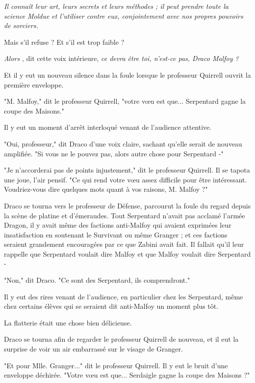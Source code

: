 \emph{Il connaît leur art, leurs secrets et leurs méthodes ; il peut prendre toute la science Moldue et l'utiliser contre eux, conjointement avec nos propres pouvoirs de sorciers.} 

Mais s'il refuse ? Et s'il est trop faible ?

\emph{Alors} , dit cette voix intérieure, \emph{ce devra être toi, n'est-ce pas, Draco Malfoy ?} 

Et il y eut un nouveau silence dans la foule lorsque le professeur Quirrell ouvrit la première enveloppe.

"M. Malfoy," dit le professeur Quirrell, "votre vœu est que... Serpentard gagne la coupe des Maisons."

Il y eut un moment d'arrêt interloqué venant de l'audience attentive.

"Oui, professeur," dit Draco d'une voix claire, sachant qu'elle serait de nouveau amplifiée. "Si vous ne le pouvez pas, alors autre chose pour Serpentard -"

"Je n'accorderai pas de points injustement," dit le professeur Quirrell. Il se tapota une joue, l'air pensif. "Ce qui rend votre vœu assez difficile pour être intéressant. Voudriez-vous dire quelques mots quant à vos raisons, M. Malfoy ?"

Draco se tourna vers le professeur de Défense, parcourut la foule du regard depuis la scène de platine et d'émeraudes. Tout Serpentard n'avait pas acclamé l'armée Dragon, il y avait même des factions anti-Malfoy qui avaient exprimées leur insatisfaction en soutenant le Survivant ou même Granger ; et ces factions seraient grandement encouragées par ce que Zabini avait fait. Il fallait qu'il leur rappelle que Serpentard voulait dire Malfoy et que Malfoy voulait dire Serpentard -

"Non," dit Draco. "Ce sont des Serpentard, ils comprendront."

Il y eut des rires venant de l'audience, en particulier chez les Serpentard, même chez certains élèves qui se seraient dit anti-Malfoy un moment plus tôt.

La flatterie était une chose bien délicieuse.

Draco se tourna afin de regarder le professeur Quirrell de nouveau, et il eut la surprise de voir un air embarrassé sur le visage de Granger.

"Et pour Mlle. Granger..." dit le professeur Quirrell. Il y eut le bruit d'une enveloppe déchirée. "Votre vœu est que... Serdaigle gagne la coupe des Maisons ?"


